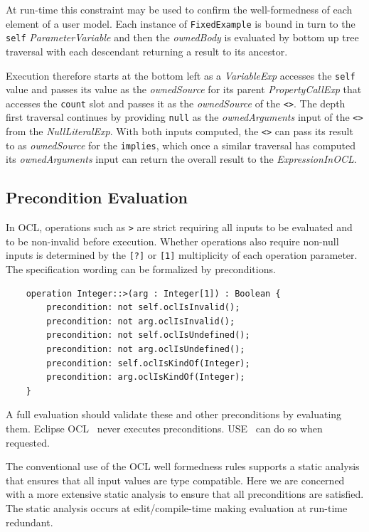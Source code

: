\documentclass[
]{ceurart}
\begin{document}
At run-time this constraint may be used to confirm the well-formedness of each element of a user model. Each instance of \verb|FixedExample| is bound in turn to the \verb|self| \emph{ParameterVariable} and then the \emph{ownedBody} is evaluated by bottom up tree traversal with each descendant returning a result to its ancestor.

Execution therefore starts at the bottom left as a \emph{VariableExp} accesses the \verb|self| value and passes its value as the \emph{ownedSource} for its parent \emph{PropertyCallExp} that accesses the \verb|count| slot and passes it as the \emph{ownedSource} of the \verb|<>|. The depth first traversal continues by providing \verb|null| as the \emph{ownedArguments} input of the \verb|<>| from the \emph{NullLiteralExp}. With both inputs computed, the \verb|<>| can pass its result to as  \emph{ownedSource} for the \verb|implies|, which once a similar traversal has computed its \emph{ownedArguments} input can return the overall result to the \emph{ExpressionInOCL}.

\subsection{Precondition Evaluation}\label{Precondition Evaluation}

In OCL, operations such as \verb|>| are strict requiring all inputs to be evaluated and to be non-invalid before execution. Whether operations also require non-null inputs is determined by the \verb|[?]| or \verb|[1]| multiplicity of each operation parameter. The specification wording can be formalized by preconditions.

\begin{verbatim}
    operation Integer::>(arg : Integer[1]) : Boolean {
        precondition: not self.oclIsInvalid();
        precondition: not arg.oclIsInvalid();
        precondition: not self.oclIsUndefined();
        precondition: not arg.oclIsUndefined();
        precondition: self.oclIsKindOf(Integer);
        precondition: arg.oclIsKindOf(Integer);
    }
\end{verbatim}

A full evaluation should validate these and other preconditions by evaluating them. Eclipse OCL~\cite{Eclipse-OCL} never executes preconditions. USE~\cite{USE} can do so when requested.

The conventional use of the OCL well formedness rules supports a static analysis that ensures that all input values are type compatible. Here we are concerned with a more extensive  static analysis to ensure that all preconditions are satisfied. The static analysis occurs at edit/compile-time making evaluation at run-time redundant.
\end{document}
